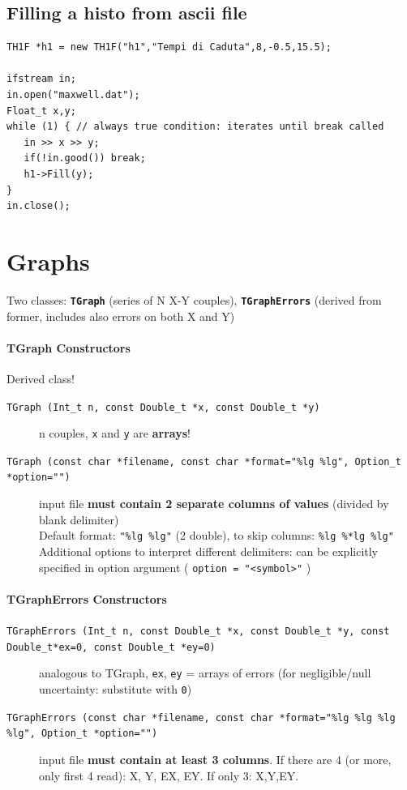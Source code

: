 \documentclass[10pt, oneside]{article}
\begin{document}
\subsection{Filling a histo from ascii file}
\begin{verbatim}
TH1F *h1 = new TH1F("h1","Tempi di Caduta",8,-0.5,15.5); 

ifstream in;
in.open("maxwell.dat");
Float_t x,y;
while (1) { // always true condition: iterates until break called
   in >> x >> y;
   if(!in.good()) break;
   h1->Fill(y);
}
in.close();
\end{verbatim}


\section{Graphs}
Two classes: \textbf{\texttt{TGraph}} (series of N X-Y couples), \textbf{\texttt{TGraphErrors}} (derived from former, includes also errors on both X and Y)
\paragraph{TGraph Constructors} Derived class!
\begin{description}
\item[\texttt{TGraph (Int\_t n, const Double\_t *x, const Double\_t *y)
}] n couples, \texttt{x} and \texttt{y} are \textbf{arrays}!
\item[\texttt{TGraph (const char *filename, const char *format="\%lg \%lg", 
Option\_t *option="")}] input file \textbf{must contain 2 separate columns of values} (divided by blank delimiter) 
\\Default format: \texttt{"\%lg \%lg"} (2 double), to skip columns: \texttt{\%lg \%*lg \%lg"}
\\Additional options to interpret different delimiters: can be explicitly specified in option argument ( \texttt{option = "<symbol>"} )
\end{description}
\paragraph{TGraphErrors Constructors}
\begin{description}
\item[\texttt{TGraphErrors (Int\_t n, const Double\_t *x, const Double\_t *y, const Double\_t*ex=0, const Double\_t *ey=0)}] analogous to TGraph, \texttt{ex}, \texttt{ey} = arrays of errors (for negligible/null uncertainty: substitute with \texttt{0})
\item[\texttt{TGraphErrors (const char *filename, const char *format="\%lg \%lg \%lg \%lg", Option\_t *option="")}] input file \textbf{must contain at least 3 columns}. If there are 4 (or more, only first 4 read): X, Y, EX, EY. If only 3: X,Y,EY.
\end{description}
\end{document}
